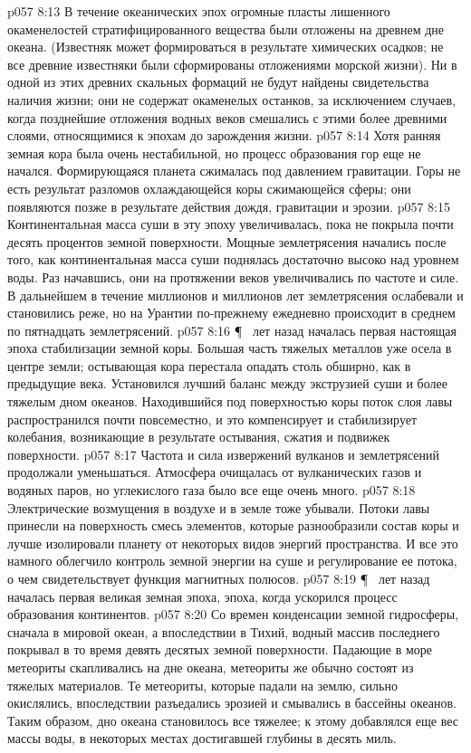 \vs p057 8:13 В течение океанических эпох огромные пласты лишенного окаменелостей стратифицированного вещества были отложены на древнем дне океана. (Известняк может формироваться в результате химических осадков; не все древние известняки были сформированы отложениями морской жизни). Ни в одной из этих древних скальных формаций не будут найдены свидетельства наличия жизни; они не содержат окаменелых останков, за исключением случаев, когда позднейшие отложения водных веков смешались с этими более древними слоями, относящимися к эпохам до зарождения жизни.
\vs p057 8:14 Хотя ранняя земная кора была очень нестабильной, но процесс образования гор еще не начался. Формирующаяся планета сжималась под давлением гравитации. Горы не есть результат разломов охлаждающейся коры сжимающейся сферы; они появляются позже в результате действия дождя, гравитации и эрозии.
\vs p057 8:15 Континентальная масса суши в эту эпоху увеличивалась, пока не покрыла почти десять процентов земной поверхности. Мощные землетрясения начались после того, как континентальная масса суши поднялась достаточно высоко над уровнем воды. Раз начавшись, они на протяжении веков увеличивались по частоте и силе. В дальнейшем в течение миллионов и миллионов лет землетрясения ослабевали и становились реже, но на Урантии по\hyp{}прежнему ежедневно происходит в среднем по пятнадцать землетрясений.
\vs p057 8:16 \P\  лет назад началась первая настоящая эпоха стабилизации земной коры. Большая часть тяжелых металлов уже осела в центре земли; остывающая кора перестала опадать столь обширно, как в предыдущие века. Установился лучший баланс между экструзией суши и более тяжелым дном океанов. Находившийся под поверхностью коры поток слоя лавы распространился почти повсеместно, и это компенсирует и стабилизирует колебания, возникающие в результате остывания, сжатия и подвижек поверхности.
\vs p057 8:17 Частота и сила извержений вулканов и землетрясений продолжали уменьшаться. Атмосфера очищалась от вулканических газов и водяных паров, но углекислого газа было все еще очень много.
\vs p057 8:18 Электрические возмущения в воздухе и в земле тоже убывали. Потоки лавы принесли на поверхность смесь элементов, которые разнообразили состав коры и лучше изолировали планету от некоторых видов энергий пространства. И все это намного облегчило контроль земной энергии на суше и регулирование ее потока, о чем свидетельствует функция магнитных полюсов.
\vs p057 8:19 \P\  лет назад началась первая великая земная эпоха, эпоха, когда ускорился процесс образования континентов.
\vs p057 8:20 Со времен конденсации земной гидросферы, сначала в мировой океан, а впоследствии в Тихий, водный массив последнего покрывал в то время девять десятых земной поверхности. Падающие в море метеориты скапливались на дне океана, метеориты же обычно состоят из тяжелых материалов. Те метеориты, которые падали на землю, сильно окислялись, впоследствии разъедались эрозией и смывались в бассейны океанов. Таким образом, дно океана становилось все тяжелее; к этому добавлялся еще вес массы воды, в некоторых местах достигавшей глубины в десять миль.
